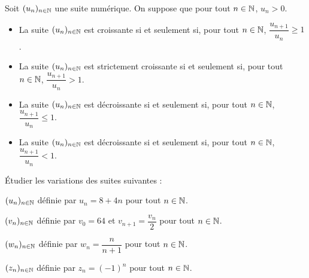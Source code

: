 \documentclass{poly}
\begin{document}
\begin{proposition}
Soit $(u_n)_{n \in \mathbb{N}}$ une suite numérique. On suppose que pour tout $n \in \mathbb{N}$, $u_n > 0$.
\begin{itemize}
\item La suite $(u_n)_{n \in \mathbb{N}}$ est croissante si et seulement si, pour tout $n \in \mathbb{N}$, $\dfrac{u_{n+1}}{u_n} \geq 1$. 
\item La suite $(u_n)_{n \in \mathbb{N}}$ est strictement croissante si et seulement si, pour tout $n \in \mathbb{N}$, $\dfrac{u_{n+1}}{u_n} > 1$. 
\item La suite $(u_n)_{n \in \mathbb{N}}$ est décroissante si et seulement si, pour tout $n \in \mathbb{N}$, $\dfrac{u_{n+1}}{u_n} \leq 1$. 
\item La suite $(u_n)_{n \in \mathbb{N}}$ est décroissante si et seulement si, pour tout $n \in \mathbb{N}$, $\dfrac{u_{n+1}}{u_n} < 1$. 
\end{itemize}
\end{proposition}
\begin{example}
Étudier les variations des suites suivantes :
\begin{alphaquestions}
\item $(u_n)_{n \in \mathbb{N}}$ définie par $u_n = 8 + 4n$ pour tout $n \in \mathbb{N}$.
\item $(v_n)_{n \in \mathbb{N}}$ définie par $v_0 = 64$ et $v_{n+1} = \dfrac{v_n}{2}$ pour tout $n \in \mathbb{N}$.
\item $(w_n)_{n \in \mathbb{N}}$ définie par $w_n = \dfrac{n}{n+1}$ pour tout $n \in \mathbb{N}$.
\item $(z_n)_{n \in \mathbb{N}}$ définie par $z_n = (-1)^n$ pour tout $n \in \mathbb{N}$.
\end{alphaquestions}
\end{example}
\newpage
\end{document}

